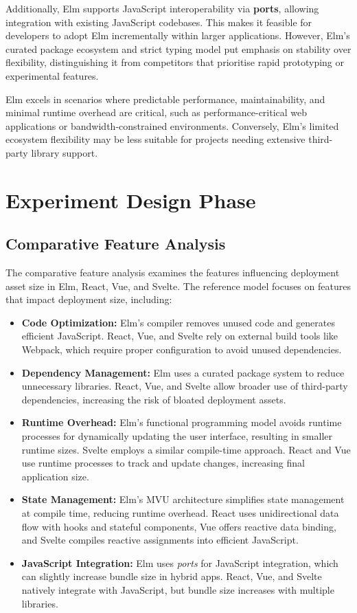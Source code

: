 Additionally, Elm supports JavaScript interoperability via \textbf{ports}, allowing integration with existing JavaScript codebases. This makes it feasible for developers to adopt Elm incrementally within larger applications. However, Elm’s curated package ecosystem and strict typing model put emphasis on stability over flexibility, distinguishing it from competitors that prioritise rapid prototyping or experimental features.

Elm excels in scenarios where predictable performance, maintainability, and minimal runtime overhead are critical, such as performance-critical web applications or bandwidth-constrained environments. Conversely, Elm’s limited ecosystem flexibility may be less suitable for projects needing extensive third-party library support.

\section{Experiment Design Phase}

\subsection{Comparative Feature Analysis}
The comparative feature analysis examines the features influencing deployment asset size in Elm, React, Vue, and Svelte. The reference model focuses on features that impact deployment size, including:

\begin{itemize}
    \item \textbf{Code Optimization:} Elm's compiler removes unused code and generates efficient JavaScript. React, Vue, and Svelte rely on external build tools like Webpack, which require proper configuration to avoid unused dependencies.
    \item \textbf{Dependency Management:} Elm uses a curated package system to reduce unnecessary libraries. React, Vue, and Svelte allow broader use of third-party dependencies, increasing the risk of bloated deployment assets.
    \item \textbf{Runtime Overhead:} Elm's functional programming model avoids runtime processes for dynamically updating the user interface, resulting in smaller runtime sizes. Svelte employs a similar compile-time approach. React and Vue use runtime processes to track and update changes, increasing final application size.
    \item \textbf{State Management:} Elm's MVU architecture simplifies state management at compile time, reducing runtime overhead. React uses unidirectional data flow with hooks and stateful components, Vue offers reactive data binding, and Svelte compiles reactive assignments into efficient JavaScript.
    \item \textbf{JavaScript Integration:} Elm uses \textit{ports} for JavaScript integration, which can slightly increase bundle size in hybrid apps. React, Vue, and Svelte natively integrate with JavaScript, but bundle size increases with multiple libraries.
\end{itemize}

